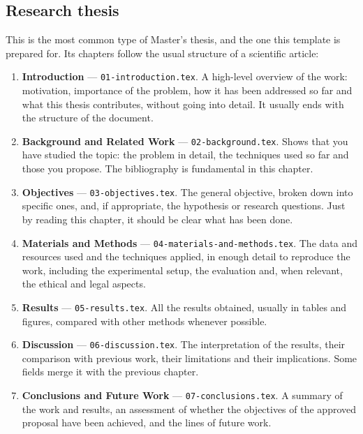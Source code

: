 \subsection{Research thesis}\label{sec:research-thesis}

This is the most common type of Master's thesis, and the one this template is prepared for.
Its chapters follow the usual structure of a scientific article:

\begin{enumerate}
  \item \textbf{Introduction} --- \texttt{01-introduction.tex}. A high-level overview of
        the work: motivation, importance of the problem, how it has been addressed so far
        and what this thesis contributes, without going into detail. It usually ends with
        the structure of the document.
  \item \textbf{Background and Related Work} --- \texttt{02-background.tex}. Shows that you
        have studied the topic: the problem in detail, the techniques used so far and those
        you propose. The bibliography is fundamental in this chapter.
  \item \textbf{Objectives} --- \texttt{03-objectives.tex}. The general objective, broken
        down into specific ones, and, if appropriate, the hypothesis or research questions.
        Just by reading this chapter, it should be clear what has been done.
  \item \textbf{Materials and Methods} --- \texttt{04-materials-and-methods.tex}. The data
        and resources used and the techniques applied, in enough detail to reproduce the
        work, including the experimental setup, the evaluation and, when relevant, the
        ethical and legal aspects.
  \item \textbf{Results} --- \texttt{05-results.tex}. All the results obtained, usually in
        tables and figures, compared with other methods whenever possible.
  \item \textbf{Discussion} --- \texttt{06-discussion.tex}. The interpretation of the
        results, their comparison with previous work, their limitations and their
        implications. Some fields merge it with the previous chapter.
  \item \textbf{Conclusions and Future Work} --- \texttt{07-conclusions.tex}. A summary of
        the work and results, an assessment of whether the objectives of the approved
        proposal have been achieved, and the lines of future work.
\end{enumerate}

